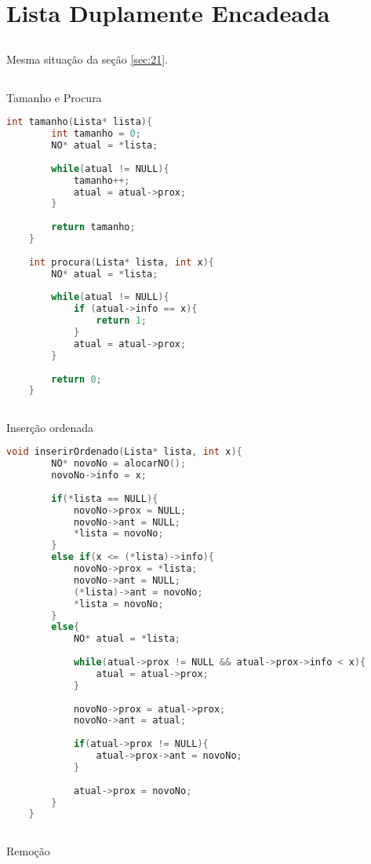 \section{Lista Duplamente Encadeada}
\subsection{} Mesma  situação da seção \ref{sec:21}. 
\subsection{} Tamanho e Procura

\begin{lstlisting}[language=C]
	int tamanho(Lista* lista){
		int tamanho = 0;
		NO* atual = *lista;
		
		while(atual != NULL){
			tamanho++;
			atual = atual->prox; 
		}
		
		return tamanho;
	}
	
	int procura(Lista* lista, int x){
		NO* atual = *lista; 
		
		while(atual != NULL){
			if (atual->info == x){
				return 1; 
			}
			atual = atual->prox; 
		}
		
		return 0; 
	}
\end{lstlisting}

\subsection{} Inserção ordenada
\begin{lstlisting}[language=C]
	void inserirOrdenado(Lista* lista, int x){
		NO* novoNo = alocarNO();
		novoNo->info = x; 
		
		if(*lista == NULL){
			novoNo->prox = NULL;
			novoNo->ant = NULL;
			*lista = novoNo;
		} 
		else if(x <= (*lista)->info){
			novoNo->prox = *lista;
			novoNo->ant = NULL;
			(*lista)->ant = novoNo;
			*lista = novoNo;
		} 
		else{
			NO* atual = *lista;
			
			while(atual->prox != NULL && atual->prox->info < x){
				atual = atual->prox;
			}
			
			novoNo->prox = atual->prox;
			novoNo->ant = atual;
			
			if(atual->prox != NULL){
				atual->prox->ant = novoNo;
			}
			
			atual->prox = novoNo;
		}
	}
\end{lstlisting}

\subsection{} Remoção

